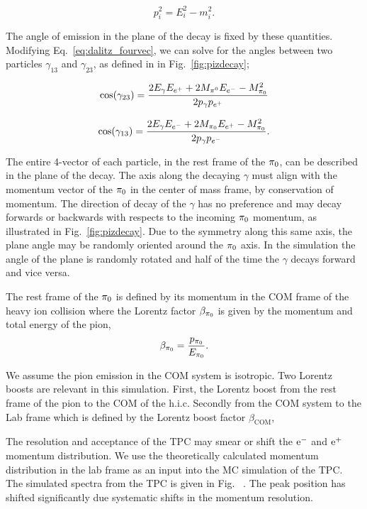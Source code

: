 \documentclass[12pt, letterpaper, twoside]{article}
\begin{document}
\begin{equation}
p_i^2 = E_i^2 - m_i^2.
\end{equation}

The angle of emission in the plane of the decay is fixed by these quantities. Modifying Eq.~\ref{eq:dalitz_fourvec}, we can solve for the angles between two particles $\gamma_{13}$ and $\gamma_{23}$, as defined in in Fig.~\ref{fig:pizdecay};

\begin{equation}
\cos(\gamma_{23}) =  \frac{2E_\gamma E_{e^+} + 2M_{\pi^0}E_{e^-} -M_{\mathrm{\pi_0}}^2}{2p_{\gamma}p_{e^+}}
\end{equation}

\begin{equation}
\cos(\gamma_{13}) =  \frac{2E_\gamma E_{e^-} + 2M_{\mathrm{\pi_0}}E_{e^+} -M_{\mathrm{\pi_0}}^2}{2p_{\gamma}p_{e^-}}.
\end{equation}

The entire 4-vector of each particle, in the rest frame of the $\mathrm{\pi_0}$, can be described in the plane of the decay. The axis along the decaying $\gamma$ must align with the momentum vector of the $\mathrm{\pi_0}$ in the center of mass frame, by conservation of momentum. The direction of decay of the $\gamma$ has no preference and may decay forwards or backwards with respects to the incoming $\mathrm{\pi_0}$ momentum, as illustrated in Fig.~\ref{fig:pizdecay}. Due to the symmetry along this same axis, the plane angle may be randomly oriented around the $\mathrm{\pi_0}$ axis. In the simulation the angle of the plane is randomly rotated and half of the time the $\gamma$ decays forward and vice versa. 

The rest frame of the $\mathrm{\pi_0}$ is defined by its momentum in the COM frame of the heavy ion collision where the Lorentz factor $\beta_{\mathrm{\pi_0}}$ is given by the momentum and total energy of the pion,
\begin{equation}
\beta_{\mathrm{\pi_0}} = \frac{ p_{\mathrm{\pi_0}} }{E_{\mathrm{\pi_0}}}.
\end{equation}

We assume the pion emission in the COM system is isotropic. Two Lorentz boosts are relevant in this simulation. First, the Lorentz boost from the rest frame of the pion to the COM of the h.i.c. Secondly from the COM system to the Lab frame which is defined by the Lorentz boost factor $\beta_{\mathrm{COM}}$, 

The resolution and acceptance of the TPC may smear or shift the $\mathrm{e^-}$ and $\mathrm{e^+}$ momentum distribution. We use the theoretically calculated momentum distribution in the lab frame as an input into the MC simulation of the TPC. The simulated spectra from the TPC is given in Fig.~ . The peak position has shifted significantly due systematic shifts in the momentum resolution. 
\end{document}
